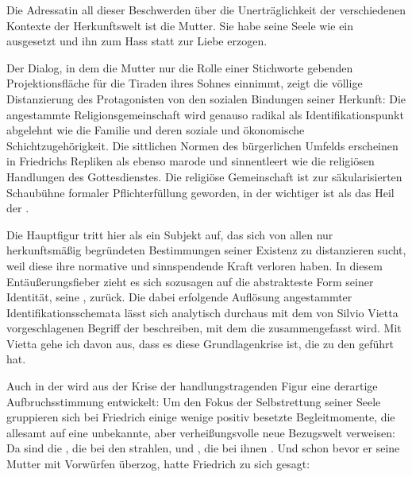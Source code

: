 Die Adressatin all dieser Beschwerden über die Unerträglichkeit der
verschiedenen Kontexte der Herkunftswelt ist die Mutter. Sie habe seine Seele
wie ein \Cite{nacktes Kind} ausgesetzt und ihn zum Hass statt zur Liebe
erzogen.

Der Dialog, in dem die Mutter nur die Rolle einer Stichworte gebenden
Projektionsfläche für die \Cite{fiebernden} Tiraden ihres Sohnes einnimmt,
zeigt die völlige Distanzierung des Protagonisten von den sozialen Bindungen
seiner Herkunft: Die angestammte Religionsgemeinschaft wird genauso radikal
als Identifikationspunkt abgelehnt wie die Familie und deren soziale und
ökonomische Schichtzugehörigkeit. Die sittlichen Normen des bürgerlichen
Umfelds erscheinen in Friedrichs Repliken als ebenso marode und sinnentleert
wie die religiösen Handlungen des Gottesdienstes. Die religiöse Gemeinschaft
ist zur säkularisierten Schaubühne formaler Pflichterfüllung geworden, in der
\Cite{wirtschaftliches Fortkommen} wichtiger ist als das Heil der \Cite{Seele}
.

Die Hauptfigur tritt hier als ein Subjekt auf, das sich von allen nur
herkunftsmäßig begründeten Bestimmungen seiner Existenz zu distanzieren sucht,
weil diese ihre normative und sinnspendende Kraft verloren haben.  In diesem
Entäußerungsfieber zieht es sich sozusagen auf die abstrakteste Form seiner
Identität, seine \Cite{Seele}, zurück. Die dabei erfolgende Auflösung
angestammter Identifikationsschemata lässt sich analytisch durchaus mit dem
von Silvio Vietta vorgeschlagenen Begriff der \Cite{Ichdissoziation}
beschreiben, mit dem die \Cite{im Expressionismus zur Darstellung kommende
  grundlegende Strukturkrise des modernen Subjekts} zusammengefasst wird. Mit
Vietta gehe ich davon aus, dass es diese Grundlagenkrise ist, die zu den
\Cite{typischen expressionistischen Aufbruchs- und Erneuerungsversuchen}
geführt hat.

Auch in der  wird aus der Krise der handlungstragenden
Figur eine derartige Aufbruchsstimmung entwickelt: Um den Fokus der
Selbstrettung seiner Seele gruppieren sich bei Friedrich einige wenige positiv
besetzte Begleitmomente, die allesamt auf eine unbekannte, aber verheißungsvolle
neue Bezugswelt verweisen: Da sind die \Cite{Lichter}, die bei den
\Cite{Fremden} strahlen, und \Cite{Milde und Güte und Liebe}, die bei ihnen
\Cite{wächst} . Und schon bevor er seine Mutter mit
Vorwürfen überzog, hatte Friedrich zu sich gesagt:

